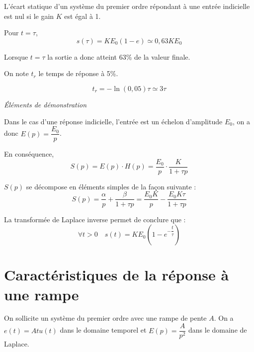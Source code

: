 \documentclass[11pt,oneside]{article}
\begin{document}
\begin{rem}
L'écart statique d'un système du premier ordre répondant à une entrée
indicielle est nul si le gain $K$ est égal à 1.
\end{rem}


\begin{resultat}
Pour $t=\tau$, 
$$
s(\tau)=KE_0 (1-e)\simeq 0,63 KE_0
$$

Lorsque $t=\tau$ la sortie a donc atteint 63\% de la valeur finale.
\end{resultat}

\begin{resultat}
On note $t_r$ le temps de réponse à 5\%.

$$ t_r = - \ln \left(0,05\right) \tau \simeq 3\tau
$$

\end{resultat}



\begin{demo}
\textit{Éléments de démonstration}


Dans le cas d'une réponse indicielle, l'entrée est un échelon d'amplitude $E_0$, on a donc $E(p)=\dfrac{E_0}{p}$. 

En conséquence, 
$$
S(p)=E(p)\cdot H(p) = \dfrac{E_0}{p} \cdot \dfrac{K}{1+\tau p}
$$

$S(p)$ se décompose en éléments simples de la façon suivante :
$$
S(p)= \dfrac{\alpha}{p} + \dfrac{\beta}{1+\tau p} = \dfrac{E_0 K}{p}- \dfrac{E_0 K \tau}{1+\tau p}
$$

La transformée de Laplace inverse permet de conclure que :
$$
\forall t>0  \quad s(t)=KE_0 \left( 1-e^{-\dfrac{t}{\tau}}\right)
$$

\end{demo}

\section{Caractéristiques de la réponse à une rampe}
On sollicite un système du premier ordre avec une rampe de pente $A$.
On a $e(t)=Atu(t)$ dans le domaine temporel et $E(p)=\dfrac{A}{p^2}$ dans le domaine de Laplace.
\end{document}
